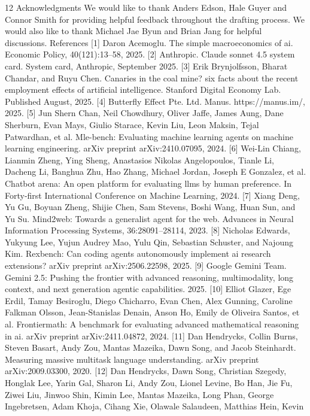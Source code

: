 12
Acknowledgments
We would like to thank Anders Edson, Hale Guyer and Connor Smith for providing helpful feedback
throughout the drafting process. We would also like to thank Michael Jae Byun and Brian Jang for
helpful discussions.
References
[1] Daron Acemoglu. The simple macroeconomics of ai. Economic Policy, 40(121):13–58, 2025.
[2] Anthropic. Claude sonnet 4.5 system card. System card, Anthropic, September 2025.
[3] Erik Brynjolfsson, Bharat Chandar, and Ruyu Chen. Canaries in the coal mine? six facts
about the recent employment effects of artificial intelligence. Stanford Digital Economy Lab.
Published August, 2025.
[4] Butterfly Effect Pte. Ltd. Manus. https://manus.im/, 2025.
[5] Jun Shern Chan, Neil Chowdhury, Oliver Jaffe, James Aung, Dane Sherburn, Evan Mays, Giulio
Starace, Kevin Liu, Leon Maksin, Tejal Patwardhan, et al. Mle-bench: Evaluating machine
learning agents on machine learning engineering. arXiv preprint arXiv:2410.07095, 2024.
[6] Wei-Lin Chiang, Lianmin Zheng, Ying Sheng, Anastasios Nikolas Angelopoulos, Tianle Li,
Dacheng Li, Banghua Zhu, Hao Zhang, Michael Jordan, Joseph E Gonzalez, et al. Chatbot
arena: An open platform for evaluating llms by human preference. In Forty-first International
Conference on Machine Learning, 2024.
[7] Xiang Deng, Yu Gu, Boyuan Zheng, Shijie Chen, Sam Stevens, Boshi Wang, Huan Sun, and
Yu Su. Mind2web: Towards a generalist agent for the web. Advances in Neural Information
Processing Systems, 36:28091–28114, 2023.
[8] Nicholas Edwards, Yukyung Lee, Yujun Audrey Mao, Yulu Qin, Sebastian Schuster, and
Najoung Kim. Rexbench: Can coding agents autonomously implement ai research extensions?
arXiv preprint arXiv:2506.22598, 2025.
[9] Google Gemini Team. Gemini 2.5: Pushing the frontier with advanced reasoning, multimodality,
long context, and next generation agentic capabilities. 2025.
[10] Elliot Glazer, Ege Erdil, Tamay Besiroglu, Diego Chicharro, Evan Chen, Alex Gunning,
Caroline Falkman Olsson, Jean-Stanislas Denain, Anson Ho, Emily de Oliveira Santos, et al.
Frontiermath: A benchmark for evaluating advanced mathematical reasoning in ai. arXiv
preprint arXiv:2411.04872, 2024.
[11] Dan Hendrycks, Collin Burns, Steven Basart, Andy Zou, Mantas Mazeika, Dawn Song, and
Jacob Steinhardt.
Measuring massive multitask language understanding.
arXiv preprint
arXiv:2009.03300, 2020.
[12] Dan Hendrycks, Dawn Song, Christian Szegedy, Honglak Lee, Yarin Gal, Sharon Li, Andy Zou,
Lionel Levine, Bo Han, Jie Fu, Ziwei Liu, Jinwoo Shin, Kimin Lee, Mantas Mazeika, Long
Phan, George Ingebretsen, Adam Khoja, Cihang Xie, Olawale Salaudeen, Matthias Hein, Kevin
